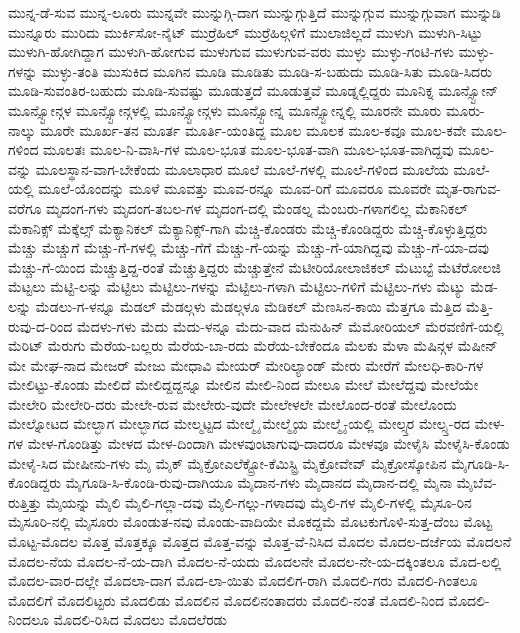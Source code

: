 {ಮುನ್ನ-ಡೆ-ಸುವ
ಮುನ್ನ-ಲೂರು
ಮುನ್ನವೇ
ಮುನ್ನುಗ್ಗಿ-ದಾಗ
ಮುನ್ನುಗ್ಗುತ್ತಿದೆ
ಮುನ್ನುಗ್ಗುವ
ಮುನ್ನುಗ್ಗುವಾಗ
ಮುನ್ನುಡಿ
ಮುನ್ನೂರು
ಮುರಿದು
ಮುರ್ಕಿಸೋ-ನೈಟ್
ಮುರ್ರೆಹಿಲ್
ಮುರ್ರೆಹಿಲ್ಗಳಿಗೆ
ಮುಲಾಜಿಲ್ಲದೆ
ಮುಳುಗಿ
ಮುಳುಗಿ-ಸಿಟ್ಟು
ಮುಳುಗಿ-ಹೋಗಿದ್ದಾಗ
ಮುಳುಗಿ-ಹೋಗುವ
ಮುಳುಗುವ
ಮುಳುಗುವ-ವರು
ಮುಳ್ಳು
ಮುಳ್ಳು-ಗಂಟಿ-ಗಳು
ಮುಳ್ಳು-ಗಳನ್ನು
ಮುಳ್ಳು-ತಂತಿ
ಮುಸುಕಿದ
ಮೂಗಿನ
ಮೂಡಿ
ಮೂಡಿತು
ಮೂಡಿ-ಸ-ಬಹುದು
ಮೂಡಿ-ಸಿತು
ಮೂಡಿ-ಸಿದರು
ಮೂಡಿ-ಸುವಂತಿರ-ಬಹುದು
ಮೂಡಿ-ಸುವಷ್ಟು
ಮೂಡುತ್ತದೆ
ಮೂಡುತ್ತವೆ
ಮೂಡ್ನಲ್ಲಿದ್ದರು
ಮೂನಿಕ್ನ
ಮೂನ್ಸ್ಟೋನ್
ಮೂನ್ಸ್ಟೋನ್ಗಳ
ಮೂನ್ಸ್ಟೋನ್ಗಳಲ್ಲಿ
ಮೂನ್ಸ್ಟೋನ್ಗಳು
ಮೂನ್ಸ್ಟೋನ್ನ
ಮೂನ್ಸ್ಟೋನ್ನಲ್ಲಿ
ಮೂರನೇ
ಮೂರು
ಮೂರು-ನಾಲ್ಕು
ಮೂರೇ
ಮೂರ್ಖ-ತನ
ಮೂರ್ತ
ಮೂರ್ತಿ-ಯಂತಿದ್ದ
ಮೂಲ
ಮೂಲಕ
ಮೂಲ-ಕವೂ
ಮೂಲ-ಕವೇ
ಮೂಲ-ಗಳಿಂದ
ಮೂಲತಃ
ಮೂಲ-ನಿ-ವಾಸಿ-ಗಳ
ಮೂಲ-ಭೂತ
ಮೂಲ-ಭೂತ-ವಾಗಿ
ಮೂಲ-ಭೂತ-ವಾಗಿದ್ದವು
ಮೂಲ-ವನ್ನು
ಮೂಲಸ್ಥಾನ-ವಾಗ-ಬೇಕೆಂದು
ಮೂಲಾಧಾರ
ಮೂಲೆ
ಮೂಲೆ-ಗಳಲ್ಲಿ
ಮೂಲೆ-ಗಳಿಂದ
ಮೂಲೆಯ
ಮೂಲೆ-ಯಲ್ಲಿ
ಮೂಲೆ-ಯೊಂದನ್ನು
ಮೂಳೆ
ಮೂವತ್ತು
ಮೂವ-ರನ್ನೂ
ಮೂವ-ರಿಗೆ
ಮೂವರೂ
ಮೂವರೇ
ಮೃತ-ರಾಗುವ-ವರೆಗೂ
ಮೃದಂಗ-ಗಳು
ಮೃದಂಗ-ತಬಲ-ಗಳ
ಮೃದಂಗ-ದಲ್ಲಿ
ಮೆಂಡಲ್ನ
ಮೆಂಬರು-ಗಳಾಗಲಿಲ್ಲ
ಮೆಕಾನಿಕಲ್
ಮೆಕಾನಿಕ್ಸ್
ಮೆಕ್ಕೆಲ್ಸ್
ಮೆಕ್ಯಾನಿಕಲ್
ಮೆಕ್ಯಾನಿಕ್ಸ್-ಗಾಗಿ
ಮೆಚ್ಚಿ-ಕೊಂಡರು
ಮೆಚ್ಚಿ-ಕೊಂಡಿದ್ದರು
ಮೆಚ್ಚಿ-ಕೊಳ್ಳುತ್ತಿದ್ದರು
ಮೆಚ್ಚು
ಮೆಚ್ಚುಗೆ
ಮೆಚ್ಚು-ಗೆ-ಗಳಲ್ಲಿ
ಮೆಚ್ಚು-ಗೆಗೆ
ಮೆಚ್ಚು-ಗೆ-ಯನ್ನು
ಮೆಚ್ಚು-ಗೆ-ಯಾಗಿದ್ದವು
ಮೆಚ್ಚು-ಗೆ-ಯಾ-ದವು
ಮೆಚ್ಚು-ಗೆ-ಯಿಂದ
ಮೆಚ್ಚುತ್ತಿದ್ದ-ರಂತೆ
ಮೆಚ್ಚುತ್ತಿದ್ದರು
ಮೆಚ್ಚುತ್ತೇನೆ
ಮೆಟೀರಿಯೋಲಾಜಿಕಲ್
ಮೆಟುಬ್ಟೆ
ಮೆಟೆರೋಲಜಿ
ಮೆಟ್ಟಲು
ಮೆಟ್ಟಿ-ಲನ್ನು
ಮೆಟ್ಟಿಲು
ಮೆಟ್ಟಿಲು-ಗಳನ್ನು
ಮೆಟ್ಟಿಲು-ಗಳಾಗಿ
ಮೆಟ್ಟಿಲು-ಗಳಿಗೆ
ಮೆಟ್ಟಿಲು-ಗಳು
ಮೆಟ್ಯು
ಮೆಡ-ಲನ್ನು
ಮೆಡಲು-ಗ-ಳನ್ನೂ
ಮೆಡಲ್
ಮೆಡಲ್ಗಳು
ಮೆಡಲ್ಗಳೂ
ಮೆಡಿಕಲ್
ಮೆಣಸಿನ-ಕಾಯಿ
ಮೆತ್ತಗೂ
ಮೆತ್ತಿದ
ಮೆತ್ತಿ-ರುವು-ದ-ರಿಂದ
ಮೆದಳು-ಗಳು
ಮೆದು
ಮೆದು-ಳನ್ನೂ
ಮೆದು-ವಾದ
ಮೆನುಹಿನ್
ಮೆಮೋರಿಯಲ್
ಮೆರವಣಿಗೆ-ಯಲ್ಲಿ
ಮೆರಿಟ್
ಮೆರುಗು
ಮೆರೆಯ-ಬಲ್ಲರು
ಮೆರೆಯ-ಬಾ-ರದು
ಮೆರೆಯ-ಬೇಕೆಂದೂ
ಮೆಲಕು
ಮೆಳಾ
ಮೆಷಿನ್ಗಳ
ಮೆಷೀನ್
ಮೇ
ಮೇಘ-ನಾದ
ಮೇಜರ್
ಮೇಜು
ಮೇಧಾವಿ
ಮೇಯರ್
ಮೇರಿಲ್ಯಾಂಡ್
ಮೇರು
ಮೇರೆಗೆ
ಮೇಲಧಿ-ಕಾರಿ-ಗಳ
ಮೇಲಿಟ್ಟು-ಕೊಂಡು
ಮೇಲಿದೆ
ಮೇಲಿದ್ದದ್ದನ್ನೂ
ಮೇಲಿನ
ಮೇಲಿ-ನಿಂದ
ಮೇಲೂ
ಮೇಲೆ
ಮೇಲೆದ್ದವು
ಮೇಲೆಯೇ
ಮೇಲೇರಿ
ಮೇಲೇರಿ-ದರು
ಮೇಲೇ-ರುವ
ಮೇಲೇರು-ವುದೇ
ಮೇಲೇಳಲೇ
ಮೇಲೊಂದ-ರಂತೆ
ಮೇಲೊಂದು
ಮೇಲ್ನೋಟದ
ಮೇಲ್ಭಾಗ
ಮೇಲ್ಭಾಗದ
ಮೇಲ್ಮಟ್ಟದ
ಮೇಲ್ಮೈ
ಮೇಲ್ಮೈಯ
ಮೇಲ್ಮೈ-ಯಲ್ಲಿ
ಮೇಲ್ಸ್ತರ
ಮೇಲ್ಸ್ತ-ರದ
ಮೇಳ-ಗಳ
ಮೇಳ-ಗೊಂಡಿತ್ತು
ಮೇಳದ
ಮೇಳ-ದಿಂದಾಗಿ
ಮೇಳವುಂಟಾಗುವು-ದಾದರೂ
ಮೇಳವೂ
ಮೇಳೈಸಿ
ಮೇಳೈಸಿ-ಕೊಂಡು
ಮೇಳೈ-ಸಿದ
ಮೇಷೀನು-ಗಳು
ಮೈ
ಮೈಕ್
ಮೈಕ್ರೋಎಲೆಕ್ಟ್ರೋ-ಕೆಮಿಸ್ಟ್ರಿ
ಮೈಕ್ರೋವೇವ್
ಮೈಕ್ರೋಸ್ಕೋಪಿನ
ಮೈಗೂಡಿ-ಸಿ-ಕೊಂಡಿದ್ದರು
ಮೈಗೂಡಿ-ಸಿ-ಕೊಂಡಿ-ರುವು-ದಾಗಿಯೂ
ಮೈದಾನ-ಗಳು
ಮೈದಾನದ
ಮೈದಾನ-ದಲ್ಲಿ
ಮೈನಾ
ಮೈಬೆವ-ರುತ್ತಿತ್ತು
ಮೈಯನ್ನು
ಮೈಲಿ
ಮೈಲಿ-ಗಲ್ಲಾ-ದವು
ಮೈಲಿ-ಗಲ್ಲು-ಗಳಾದವು
ಮೈಲಿ-ಗಳ
ಮೈಲಿ-ಗಳಲ್ಲಿ
ಮೈಸೂ-ರಿನ
ಮೈಸೂರಿ-ನಲ್ಲಿ
ಮೈಸೂರು
ಮೊಂಡುತ-ನವು
ಮೊಂಡು-ವಾದಿಯೇ
ಮೊಕದ್ದಮೆ
ಮೊಟಕುಗೊಳಿ-ಸುತ್ತ-ದೆಂಬ
ಮೊಟ್ಟ
ಮೊಟ್ಟ-ಮೊದಲ
ಮೊತ್ತ
ಮೊತ್ತಕ್ಕೂ
ಮೊತ್ತದ
ಮೊತ್ತ-ವನ್ನು
ಮೊತ್ತ-ವೆ-ನಿಸಿದ
ಮೊದಲ
ಮೊದಲ-ದರ್ಜೆಯ
ಮೊದಲನೆ
ಮೊದಲ-ನೆಯ
ಮೊದಲ-ನೆ-ಯ-ದಾಗಿ
ಮೊದಲ-ನೆ-ಯದು
ಮೊದಲನೇ
ಮೊದಲ-ನೇ-ಯ-ದಕ್ಕಿಂತಲೂ
ಮೊದ-ಲಲ್ಲಿ
ಮೊದಲ-ವಾರ-ದಲ್ಲೇ
ಮೊದಲಾ-ದಾಗ
ಮೊದ-ಲಾ-ಯಿತು
ಮೊದಲಿಗ-ರಾಗಿ
ಮೊದಲಿ-ಗರು
ಮೊದಲಿ-ಗಿಂತಲೂ
ಮೊದಲಿಗೆ
ಮೊದಲಿಟ್ಟರು
ಮೊದಲಿಡು
ಮೊದಲಿನ
ಮೊದಲಿನಂತಾದರು
ಮೊದಲಿ-ನಂತೆ
ಮೊದಲಿ-ನಿಂದ
ಮೊದಲಿ-ನಿಂದಲೂ
ಮೊದಲಿ-ರಿಸಿದ
ಮೊದಲು
ಮೊದಲೆರಡು
}
